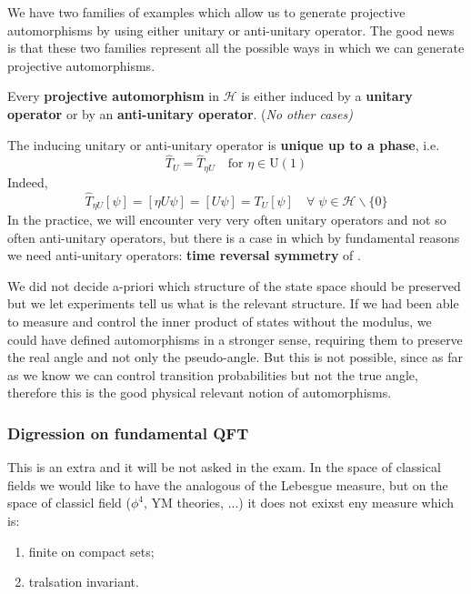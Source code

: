 \documentclass[../main.tex]{subfiles}
\begin{document}
We have two families of examples which allow us to generate projective automorphisms by using either unitary or anti-unitary operator. The good news is that these two families represent all the possible ways in which we can generate projective automorphisms.
\begin{theorem}[Wigner]
Every \textbf{projective automorphism} in $\mathcal{H}$ is either induced by a \textbf{unitary operator} or by an \textbf{anti-unitary operator}. (\textit{No other cases)}
\end{theorem}
The inducing unitary or anti-unitary operator is \textbf{unique up to a phase}, i.e.
\[
\hat{T}_U=\hat{T}_{\eta U} \quad \textrm{for }\eta\in\textrm{U}(1)
\]
Indeed,
\[
\hat{T}_{\eta U}[\psi]=[\eta U \psi]=[U \psi]=T_{U}[\psi] \quad \forall\;\psi \in \mathcal{H}\backslash  \{0\}
\]
In the practice, we will encounter very very often unitary operators and not so often anti-unitary operators, but there is a case in which by fundamental reasons we need anti-unitary operators: \textbf{time reversal symmetry} of .

We did not decide a-priori which structure of the state space should be preserved but we let experiments tell us what is the relevant structure. If we had been able to measure and control the inner product of states without the modulus, we could have defined automorphisms in a stronger sense, requiring them to preserve the real angle and not only the pseudo-angle. But this is not possible, since as far as we know we can control transition probabilities but not the true angle, therefore this is the good physical relevant notion of automorphisms.
\subsubsection{Digression on fundamental QFT}
This is an extra and it will be not asked in the exam. In the space of classical fields we would like to have the analogous of the Lebesgue measure, but on the space of classicl field ($\phi^4$, YM theories, ...) it does not exixst eny measure which is:
\begin{enumerate}
    \item finite on compact sets;
    \item tralsation invariant.
\end{enumerate}
\end{document}
